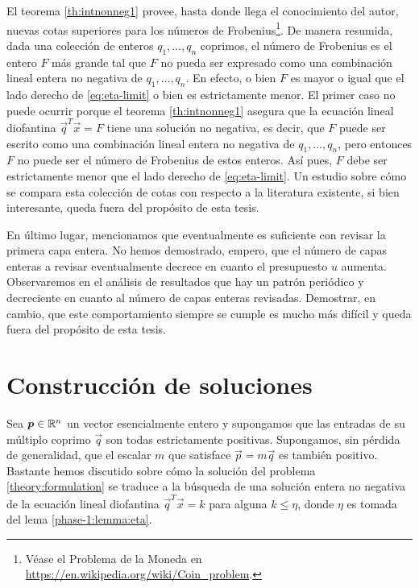 El teorema \ref{th:intnonneg1} provee, hasta donde llega el
conocimiento del autor, nuevas cotas superiores para los números de Frobenius\footnote{
	Véase el Problema de la Moneda en \url{https://en.wikipedia.org/wiki/Coin_problem}.
}. De manera resumida,
dada una colección de enteros $q_1, \ldots, q_n$ coprimos, el número de Frobenius es el entero $F$
más grande tal que $F$ no pueda ser expresado como una combinación lineal entera no negativa de
$q_1, \ldots, q_n$. En efecto, o bien $F$ es mayor o igual que el lado derecho de
\eqref{eq:eta-limit} o bien es estrictamente menor. El primer caso no puede ocurrir porque el
teorema \ref{th:intnonneg1} asegura que la ecuación lineal diofantina $\vec{q}^T\vec{x} = F$ tiene
una solución no negativa, es decir, que $F$ puede ser escrito como una combinación lineal entera no
negativa de $q_1, \ldots, q_n$, pero entonces $F$ no puede ser el número de Frobenius de estos
enteros. Así pues, $F$ debe ser estrictamente menor que el lado derecho de \eqref{eq:eta-limit}. Un
estudio sobre cómo se compara esta colección de cotas con respecto a la literatura existente, si
bien interesante, queda fuera del propósito de esta tesis.

En último lugar, mencionamos que eventualmente es suficiente con revisar la primera capa entera. No
hemos demostrado, empero, que el número de capas enteras a revisar eventualmente decrece en cuanto
el presupuesto $u$ aumenta. Observaremos en el análisis de resultados que hay un patrón periódico y
decreciente en cuanto al número de capas enteras revisadas. Demostrar, en cambio, que este
comportamiento siempre se cumple es mucho más difícil y queda fuera del propósito de esta tesis.

\section{Construcción de soluciones}
\label{subsec:complex}

\noindent
Sea $\boldsymbol{p} \in \mathbb{R}^n$ un vector esencialmente entero y supongamos que las entradas de su múltiplo
coprimo $\vec{q}$ son todas estrictamente positivas. Supongamos, sin pérdida de generalidad, que el
escalar $m$ que satisface $\vec{p} = m\vec{q}$ es también positivo. Bastante hemos discutido sobre
cómo la solución del problema \eqref{theory:formulation} se traduce a la búsqueda de una solución
entera no negativa de la ecuación lineal diofantina $\vec{q}^T\vec{x} = k$ para alguna $k \leq \eta$,
donde $\eta$ es tomada del lema \ref{phase-1:lemma:eta}.

